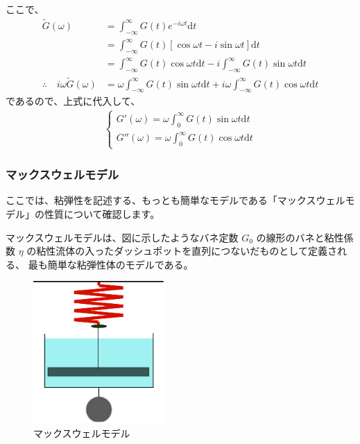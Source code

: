 \documentclass[uplatex,dvipdfmx,a4paper,11pt]{jsarticle}
\newcommand{\diff}{\mathrm d}
\begin{document}
\begin{enumerate}
ここで、
\begin{align*}
\tilde{G} (\omega) 
	&= \int_{-\infty}^{\infty} G(t) e^{-i\omega t} \diff t \\
	&= \int_{-\infty}^{\infty} G(t) [\cos \omega t - i \sin \omega t ] \diff t \\
	&= \int_{-\infty}^{\infty} G(t) \cos \omega t \diff t -i \int_{-\infty}^{\infty} G(t) \sin \omega t \diff t \\
\therefore \quad i \omega \tilde{G} (\omega) 
	&= \omega \int_{-\infty}^{\infty} G(t) \sin \omega t \diff t + i \omega \int_{-\infty}^{\infty} G(t) \cos \omega t \diff t 
\end{align*}
であるので、上式に代入して、
\begin{align*}
\begin{cases}
\displaystyle G' (\omega) = \omega \int_0^{\infty} G(t) \sin \omega t \diff t \\[8pt]
\displaystyle G'' (\omega) = \omega \int_0^{\infty} G(t) \cos \omega t \diff t
\end{cases}
\end{align*}

\end{enumerate}

\newpage

\subsubsection{マックスウェルモデル}

\begin{boxnote}

ここでは、粘弾性を記述する、もっとも簡単なモデルである「マックスウェルモデル」の性質について確認します。 

\end{boxnote}


\vspace{10pt}

マックスウェルモデルは、図に示したようなバネ定数 $G_0$ の線形のバネと粘性係数 $\eta$ の粘性流体の入ったダッシュポットを直列につないだものとして定義される、
最も簡単な粘弾性体のモデルである。
\begin{figure}[htb]
    \centering
        \includegraphics[width = 5cm]{./figures/Maxwell_model_2.eps}
        \caption{マックスウェルモデル}
\end{figure}
\end{document}
